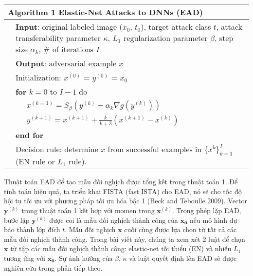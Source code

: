 \begin{center}
	\begin{tabular}{lll}
		\hline 
		\multicolumn{3}{l}{\textbf{Algorithm 1} Elastic-Net Attacks to DNNs (EAD)} \\
		\hline 
		& \multicolumn{2}{p{14cm}}{\textbf{Input}: original labeled image ($x_0$, $t_0$), target attack class $t$, attack transferability parameter $\kappa$, $L_1$ regularization parameter $\beta$, step size $\alpha_k$, \# of iterations $I$} \\
		& \multicolumn{2}{l}{\textbf{Output}: adversarial example $x$} \\
		& \multicolumn{2}{l}{Initialization: $x^{(0)}$ = $y^{(0)}$ = $x_0$} \\
		& \multicolumn{2}{l}{\textbf{for} $k = 0$ to $I - 1$ do} \\
		&& $x^{(k=1)} = S_{\beta}(y^{(k)} -\alpha_{k} \nabla g(y^{(k)}))$ \\
		&& $y^{(k+1)} = x^{(k+1)} + \frac{k}{k+3} (x^{(k+1)} - x^{(k)}) $ \\
		& \multicolumn{2}{l}{\textbf{end for}} \\
		& \multicolumn{2}{p{14cm}}{Decision rule: determine $x$ from successful examples in $\{x^k\}_{k=1}^{I}$ (EN rule or $L_1$ rule).}\\
		\hline
	\end{tabular}
	\label{arg:ag_1}
\end{center}

Thuật toán EAD để tạo mẫu đối nghịch được tổng kết trong thuật toán 1. Để tính toán hiệu quả,
 ta triển khai FISTA (fast ISTA) cho EAD, nó sẽ cho tốc độ hội tụ tối ưu với phương pháp 
 tối ưu hóa bậc 1 (Beck and Teboulle 2009). Vector $\mathbf{y}^{(k)}$ trong thuật toán 1 
 kết hợp với momen trong $\mathbf{x}^{(k)}$. Trong phép lặp EAD, bước lặp $\mathbf{y}^{(k)}$ 
 được coi là mẫu đối nghịch thành công của $\mathbf{x_0}$ nếu mô hình dự báo thành lớp 
 đích $t$. Mẫu đối nghịch $\mathbf{x}$ cuối cùng được lựa chọn từ tất cả các mẫu đối nghịch 
 thành công. Trong bài viết này, chúng ta xem xét 2 luật để chọn $\mathbf{x}$ từ tập các 
 mẫu đối nghịch thành công: elastic-net tối thiểu (EN) và nhiễu $L_1$ tương ứng với $\mathbf{x_0}$.
Sự ảnh hưởng của $\beta$, $\kappa$  và luật quyết định lên EAD sẽ được nghiên cứu trong phần tiếp theo.
